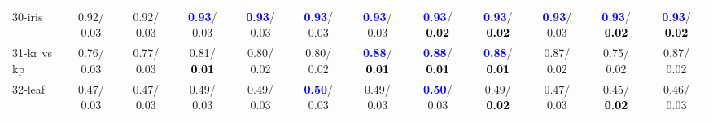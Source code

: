 \begin{table}[h]
\begin{center}
{\begin{tabular}{lc|c|c|c|c|c|c|c|c|c|c}
30-iris &   0.92/  0.03 &   0.92/  0.03 & \textcolor{blue}{\textbf{  0.93}}/  0.03 & \textcolor{blue}{\textbf{  0.93}}/  0.03 & \textcolor{blue}{\textbf{  0.93}}/  0.03 & \textcolor{blue}{\textbf{  0.93}}/  0.03 & \textcolor{blue}{\textbf{  0.93}}/\textcolor{black}{\textbf{  0.02}} & \textcolor{blue}{\textbf{  0.93}}/\textcolor{black}{\textbf{  0.02}} & \textcolor{blue}{\textbf{  0.93}}/  0.03 & \textcolor{blue}{\textbf{  0.93}}/\textcolor{black}{\textbf{  0.02}} & \textcolor{blue}{\textbf{  0.93}}/\textcolor{black}{\textbf{  0.02}} \\
31-kr vs kp &   0.76/  0.03 &   0.77/  0.03 &   0.81/\textcolor{black}{\textbf{  0.01}} &   0.80/  0.02 &   0.80/  0.02 & \textcolor{blue}{\textbf{  0.88}}/\textcolor{black}{\textbf{  0.01}} & \textcolor{blue}{\textbf{  0.88}}/\textcolor{black}{\textbf{  0.01}} & \textcolor{blue}{\textbf{  0.88}}/\textcolor{black}{\textbf{  0.01}} &   0.87/  0.02 &   0.75/  0.02 &   0.87/  0.02 \\
32-leaf &   0.47/  0.03 &   0.47/  0.03 &   0.49/  0.03 &   0.49/  0.03 & \textcolor{blue}{\textbf{  0.50}}/  0.03 &   0.49/  0.03 & \textcolor{blue}{\textbf{  0.50}}/  0.03 &   0.49/\textcolor{black}{\textbf{  0.02}} &   0.47/  0.03 &   0.45/\textcolor{black}{\textbf{  0.02}} &   0.46/  0.03 \\\end{tabular}
}\label{strats0aNB}
\end{center}
\end{table}
